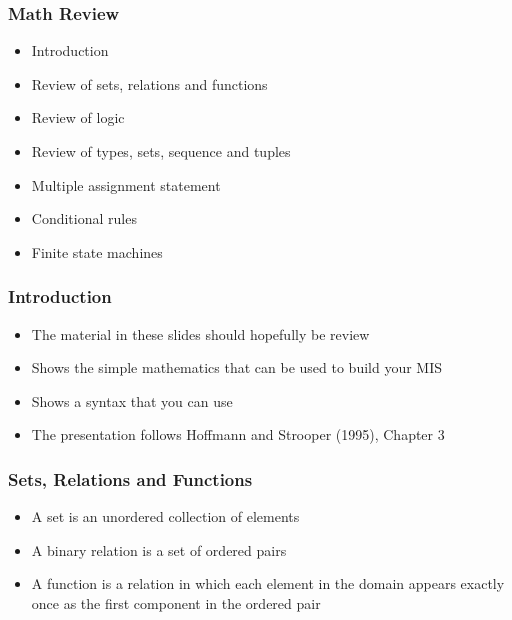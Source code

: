 \documentclass[t,12pt,numbers,fleqn]{beamer}
\begin{document}



\begin{frame}
\frametitle{Math Review}
\begin{itemize}
\item Introduction
\item Review of sets, relations and functions
\item Review of logic
\item Review of types, sets, sequence and tuples
\item Multiple assignment statement
\item Conditional rules
\item Finite state machines
\end{itemize}
\end{frame}


\begin{frame}
\frametitle{Introduction}
\begin{itemize}
\item The material in these slides should hopefully be review
\item Shows the simple mathematics that can be used to build your MIS
\item Shows a syntax that you can use
\item The presentation follows Hoffmann and Strooper (1995), Chapter 3
\end{itemize}
\end{frame}


\begin{frame}
\frametitle{Sets, Relations and Functions}
\begin{itemize}
\item A set is an unordered collection of elements
\item A binary relation is a set of ordered pairs
\item A function is a relation in which each element in the domain appears exactly once as the first component in the
ordered pair
\end{itemize}
\end{frame}

\end{document}
